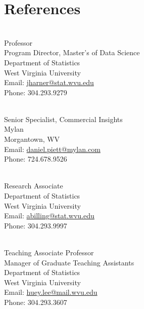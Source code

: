\documentclass[letterpaper]{deedy-resume} %
\begin{document}

\lastupdated %


\section{References}
\vspace{10pt}
\begin{flushleft}
\\
Professor\\
Program Director, Master's of Data Science\\
Department of Statistics\\
West Virginia University\\
Email: \href{mailto:jharner@stat.wvu.edu}{jharner@stat.wvu.edu}\\
Phone: 304.293.9279\\
\vspace{30pt}

\\
Senior Specialist, Commercial Insights\\
Mylan\\
Morgantown, WV\\
Email: \href{mailto:daniel.piett@mylan.com}{daniel.piett@mylan.com}\\
Phone: 724.678.9526\\
\vspace{30pt}

\\
Research Associate\\
Department of Statistics\\
West Virginia University\\
Email: \href{mailto:abilling@stat.wvu.edu}{abilling@stat.wvu.edu}\\
Phone: 304.293.9997\\
\vspace{30pt}

\\
Teaching Associate Professor\\
Manager of Graduate Teaching Assistants\\
Department of Statistics\\
West Virginia University\\
Email: \href{mailto:huey.lee@mail.wvu.edu}{huey.lee@mail.wvu.edu}\\
Phone: 304.293.3607 \\
\vspace{30pt}


\end{flushleft}
\end{document}
